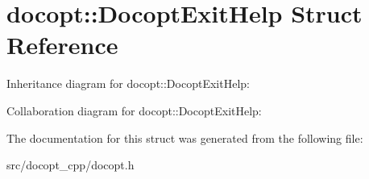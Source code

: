 \hypertarget{structdocopt_1_1DocoptExitHelp}{}\section{docopt\+:\+:Docopt\+Exit\+Help Struct Reference}
\label{structdocopt_1_1DocoptExitHelp}


Inheritance diagram for docopt\+:\+:Docopt\+Exit\+Help\+:


Collaboration diagram for docopt\+:\+:Docopt\+Exit\+Help\+:


The documentation for this struct was generated from the following file\+:\begin{DoxyCompactItemize}
\item 
src/docopt\+\_\+cpp/docopt.\+h\end{DoxyCompactItemize}
